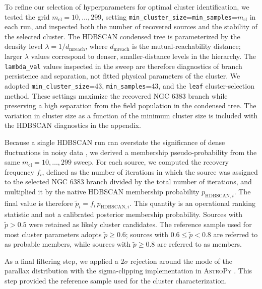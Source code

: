 \documentclass{aa}
\begin{document}
To refine our selection of hyperparameters for optimal cluster identification, we tested the grid $m_{\mathrm{cl}}=10,\ldots,299$, setting \texttt{min\_cluster\_size}=\texttt{min\_samples}=$m_{\mathrm{cl}}$ in each run, and inspected both the number of recovered sources and the stability of the selected cluster. The \textsc{HDBSCAN} condensed tree is parameterized by the density level $\lambda=1/d_{\mathrm{mreach}}$, where $d_{\mathrm{mreach}}$ is the mutual-reachability distance; larger $\lambda$ values correspond to denser, smaller-distance levels in the hierarchy. The \texttt{lambda\_val} values inspected in the sweep are therefore diagnostics of branch persistence and separation, not fitted physical parameters of the cluster. We adopted \texttt{min\_cluster\_size}=43, \texttt{min\_samples}=43, and the \texttt{leaf} cluster-selection method. These settings maximize the recovered NGC 6383 branch while preserving a high separation from the field population in the condensed tree. The variation in cluster size as a function of the minimum cluster size is included with the HDBSCAN diagnostics in the appendix.

Because a single \textsc{HDBSCAN} run can overstate the significance of dense fluctuations in noisy data \citep{2021A&A...646A.104H}, we derived a membership pseudo-probability from the same $m_{\mathrm{cl}}=10,\ldots,299$ sweep. For each source, we computed the recovery frequency $f_i$, defined as the number of iterations in which the source was assigned to the selected NGC 6383 branch divided by the total number of iterations, and multiplied it by the native \textsc{HDBSCAN} membership probability $p_{\mathrm{HDBSCAN},i}$. The final value is therefore $\tilde{p}_i=f_i\,p_{\mathrm{HDBSCAN},i}$. This quantity is an operational ranking statistic and not a calibrated posterior membership probability. Sources with $\tilde{p}>0.5$ were retained as likely cluster candidates. The reference sample used for most cluster parameters adopts $\tilde{p}\geq0.6$; sources with $0.6\leq\tilde{p}<0.8$ are referred to as probable members, while sources with $\tilde{p}\geq0.8$ are referred to as members.

As a final filtering step, we applied a $2\sigma$ rejection around the mode of the parallax distribution with the sigma-clipping implementation in \textsc{AstroPy} \citep{astropy:2013,astropy:2018,astropy:2022}. This step provided the reference sample used for the cluster characterization.
\end{document}
